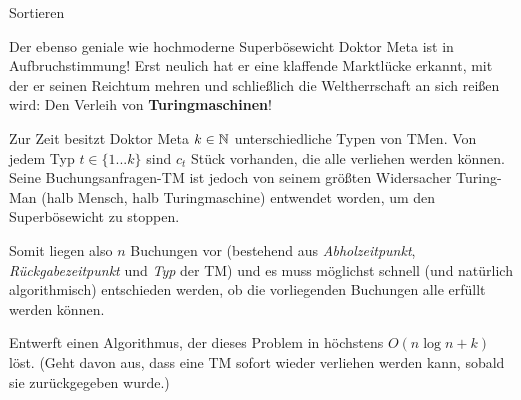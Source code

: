 \begin{frame}{Sortieren}
	{	\small
		Der ebenso geniale wie hochmoderne Superbösewicht Doktor Meta ist in Aufbruchstimmung! Erst neulich hat er eine klaffende Marktlücke erkannt, mit der er seinen Reichtum mehren und schließlich die Weltherrschaft an sich reißen wird: Den Verleih von \textbf{Turingmaschinen}!
		
		Zur Zeit besitzt Doktor Meta $k \in \mathbb{N}$ unterschiedliche Typen von TMen. Von jedem Typ $t \in \{1 ... k\}$ sind $c_t$ Stück vorhanden, die alle verliehen werden können. Seine Buchungsanfragen-TM ist jedoch von seinem größten Widersacher Turing-Man (halb Mensch, halb Turingmaschine) entwendet worden, um den Superbösewicht zu stoppen. 
		
		Somit liegen also $n$ Buchungen vor (bestehend aus \emph{Abholzeitpunkt}, \textit{Rückgabezeitpunkt} und \emph{Typ} der TM) und es muss möglichst schnell (und natürlich algorithmisch) entschieden werden, ob die vorliegenden Buchungen alle erfüllt werden können.	
			
		Entwerft einen Algorithmus, der dieses Problem in höchstens $O(n \log n + k)$  löst.
		(Geht davon aus, dass eine TM sofort wieder verliehen werden kann, sobald sie zurückgegeben wurde.)
	}
\end{frame}

